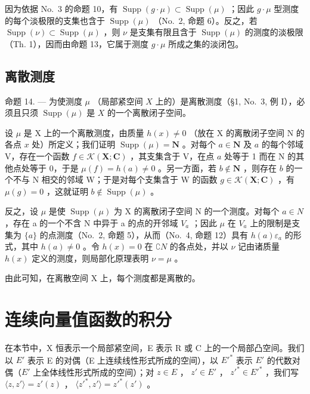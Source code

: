 因为依据 No.~3 的命题 10，有 \(\operatorname{Supp}(g\cdot\mu)\subset\operatorname{Supp}(\mu)\) ；因此 \(g\cdot\mu\) 型测度的每个淡极限的支集也含于 \(\operatorname{Supp}(\mu)\) （No.~2, 命题 6）。反之，若 \(\operatorname{Supp}(\nu)\subset\operatorname{Supp}(\mu)\) ，则 \(\nu\) 是支集有限且含于 \(\operatorname{Supp}(\mu)\) 的测度的淡极限（Th. 1），因而由命题 13，它属于测度 \(g\cdot\mu\) 所成之集的淡闭包。

\subsection{离散测度}

命题 14. --- 为使测度 \(\mu\) （局部紧空间 \(X\) 上的）是离散测度（§1, No.~3, 例 I），必须且只须 \(\operatorname{Supp}(\mu)\) 是 \(X\) 的一个离散闭子空间。

设 \(\mu\) 是 X 上的一个离散测度，由质量 \(h(x) \neq 0\) （放在 X 的离散闭子空间 N 的各点 \(x\) 处）所定义；我们证明 \(\operatorname{Supp}(\mu) = \mathbf{N}\) 。对每个 \(a \in \mathbf{N}\) 及 \(a\) 的每个邻域 V，存在一个函数 \(f \in \mathcal{K}(\mathbf{X}; \mathbf{C})\) ，其支集含于 V，在点 \(a\) 处等于 1 而在 N 的其他点处等于 0，于是 \(\mu(f) = h(a) \neq 0\) 。另一方面，若 \(b \notin \mathbf{N}\) ，则存在 \(b\) 的一个不与 N 相交的邻域 W；于是对每个支集含于 W 的函数 \(g \in \mathcal{K}(\mathbf{X}; \mathbf{C})\) ，有 \(\mu(g) = 0\) ，这就证明 \(b \notin \operatorname{Supp}(\mu)\) 。

反之，设 \(\mu\) 是使 \(\operatorname{Supp}(\mu)\) 为 X 的离散闭子空间 N 的一个测度。对每个 \(a \in N\) ，存在 a 的一个不含 N 中异于 a 的点的开邻域 \(V_{a}\) ；因此 \(\mu\) 在 \(V_{a}\) 上的限制是支集为 \(\{a\}\) 的点测度（No.~2, 命题 5），从而（No.~4, 命题 12）具有 \(h(a)\varepsilon_{a}\) 的形式，其中 \(h(a)\neq0\) 。令 \(h(x)=0\) 在 \(\complement N\) 的各点处，并以 \(\nu\) 记由诸质量 \(h(x)\) 定义的测度，则局部化原理表明 \(\nu=\mu\) 。

由此可知，在离散空间 X 上，每个测度都是离散的。

\section{连续向量值函数的积分}

在本节中，X 恒表示一个局部紧空间，E 表示 R 或 C 上的一个局部凸空间。我们以 \(E'\) 表示 E 的对偶（E 上连续线性形式所成的空间），以 \(E'^{*}\) 表示 \(E'\) 的代数对偶（\(E'\) 上全体线性形式所成的空间）；对 \(z \in E\) ， \(z' \in E'\) ， \(z'^{*} \in E'^{*}\) ，我们写 \(\langle z, z' \rangle = z'(z)\) ， \(\langle z'^{*}, z' \rangle = z'^{*}(z')\) 。

